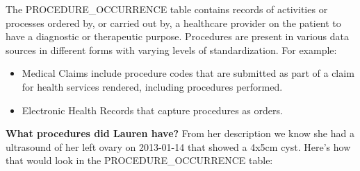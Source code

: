 \documentclass[]{book}
\providecommand{\tightlist}{%
  \setlength{\itemsep}{0pt}\setlength{\parskip}{0pt}}
\begin{document}
The PROCEDURE\_OCCURRENCE table contains records of activities or processes ordered by, or carried out by, a healthcare provider on the patient to have a diagnostic or therapeutic purpose. Procedures are present in various data sources in different forms with varying levels of standardization. For example:

\begin{itemize}
\tightlist
\item
  Medical Claims include procedure codes that are submitted as part of a claim for health services rendered, including procedures performed.
\item
  Electronic Health Records that capture procedures as orders.
\end{itemize}

\textbf{What procedures did Lauren have?}
From her description we know she had a ultrasound of her left ovary on 2013-01-14 that showed a 4x5cm cyst. Here's how that would look in the PROCEDURE\_OCCURRENCE table:
\end{document}

